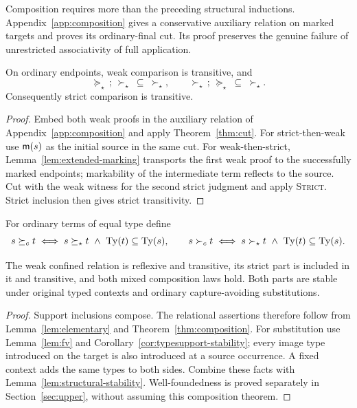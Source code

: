 Composition requires more than the preceding structural inductions.
Appendix~\ref{app:composition} gives a conservative auxiliary relation
on marked targets and proves its ordinary-final cut. Its proof preserves
the genuine failure of unrestricted associativity of full application.

\begin{theorem}\label{thm:composition}
On ordinary endpoints, weak comparison is transitive, and
\[
 \succeq_\star\,;\,\succ_\star\ \subseteq\ \succ_\star,\qquad
 \succ_\star\,;\,\succeq_\star\ \subseteq\ \succ_\star.
\]
Consequently strict comparison is transitive.
\end{theorem}
\begin{proof}
Embed both weak proofs in the auxiliary relation of
Appendix~\ref{app:composition} and apply Theorem~\ref{thm:cut}.
For strict-then-weak use $\mathsf m(s)$ as the initial source in the same cut.
For weak-then-strict, Lemma~\ref{lem:extended-marking} transports the
first weak proof to the successfully marked endpoints; markability of
the intermediate term reflects to the source. Cut with the weak witness
for the second strict judgment and apply \textsc{Strict}.
Strict inclusion then gives strict transitivity.
\end{proof}

\begin{definition}\label{def:confined}
For ordinary terms of equal type define
\[
 s\succeq_c t\iff s\succeq_\star t\ \land\ \operatorname{Ty}(t)\subseteq\operatorname{Ty}(s),\qquad
 s\succ_c t\iff s\succ_\star t\ \land\ \operatorname{Ty}(t)\subseteq\operatorname{Ty}(s).
\]
\end{definition}

\begin{theorem}\label{thm:stable}
The weak confined relation is reflexive and transitive, its strict part
is included in it and transitive, and both mixed composition laws hold.
Both parts are stable under original typed contexts and ordinary
capture-avoiding substitutions.
\end{theorem}
\begin{proof}
Support inclusions compose. The relational assertions therefore follow
from Lemma~\ref{lem:elementary} and Theorem~\ref{thm:composition}.
For substitution use Lemma~\ref{lem:fv} and
Corollary~\ref{cor:typesupport-stability}; every image type introduced
on the target is also introduced at a source occurrence. A fixed context
adds the same types to both sides. Combine these facts with
Lemma~\ref{lem:structural-stability}. Well-foundedness is proved separately
in Section~\ref{sec:upper}, without assuming this composition theorem.
\end{proof}

